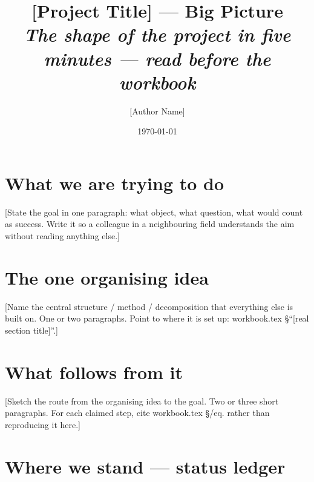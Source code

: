 \documentclass[11pt, a4paper]{article}
\title{[Project Title] — Big Picture\\
{\normalsize\textit{The shape of the project in five minutes — read before the workbook}}}
\author{[Author Name]}
\date{\today}
\begin{document}
\maketitle

\section*{What we are trying to do}

[State the goal in one paragraph: what object, what question, what would count
as success. Write it so a colleague in a neighbouring field understands the aim
without reading anything else.]

\section*{The one organising idea}

[Name the central structure / method / decomposition that everything else is
built on. One or two paragraphs. Point to where it is set up: workbook.tex
\S``[real section title]''.]

\section*{What follows from it}

[Sketch the route from the organising idea to the goal. Two or three short
paragraphs. For each claimed step, cite workbook.tex \S/eq. rather than
reproducing it here.]

\section*{Where we stand — status ledger}
\end{document}
